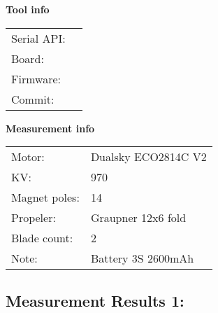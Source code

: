 \documentclass[10pt]{article}
\begin{document}
\noindent
{\large \bf Tool info}
\vspace{3mm}

\noindent
\begin{tabular}{ll}
Serial API:  & \\ 
Board:       & \\ 
Firmware:    & \\ 
Commit:      & 
\end{tabular}
\vspace{3mm}

\noindent
{\large \bf Measurement info}
\vspace{3mm}

\noindent
\begin{tabular}{ll}
Motor:        & Dualsky ECO2814C V2\\ 
KV:           & 970\\ 
Magnet poles: & 14\\ 
Propeler:     & Graupner 12x6 fold\\ 
Blade count:  & 2\\ 
Note:         & Battery 3S 2600mAh
\end{tabular}

\vspace{3mm}


\subsection*{\large \bf Measurement Results 1:}
\end{document}

